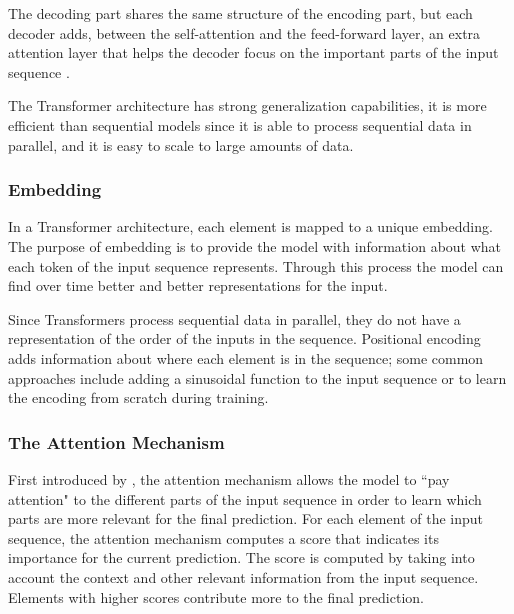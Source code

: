 The decoding part shares the same structure of the encoding part, but each decoder adds, between the self-attention and the feed-forward layer, an extra attention layer that helps the decoder focus on the important parts of the input sequence \cite{attention_is_all_you_need}.

The Transformer architecture has strong generalization capabilities, it is more efficient than sequential models since it is able to process sequential data in parallel, and it is easy to scale to large amounts of data. 

\subsubsection{Embedding} 
In a Transformer architecture, each element is mapped to a unique embedding. The purpose of embedding is to provide the model with information about what each token of the input sequence represents. Through this process the model can find over time better and better representations for the input.

Since Transformers process sequential data in parallel, they do not have a representation of the order of the inputs in the sequence. Positional encoding adds information about where each element is in the sequence; some common approaches include adding a sinusoidal function to the input sequence or to learn the encoding from scratch during training.

\subsubsection{The Attention Mechanism}
First introduced by \cite{seq2seq}, the attention mechanism allows the model to ``pay attention" to the different parts of the input sequence in order to learn which parts are more relevant for the final prediction. For each element of the input sequence, the attention mechanism computes a score that indicates its importance for the current prediction. The score is computed by taking into account the context and other relevant information from the input sequence. Elements with higher scores contribute more to the final prediction.

